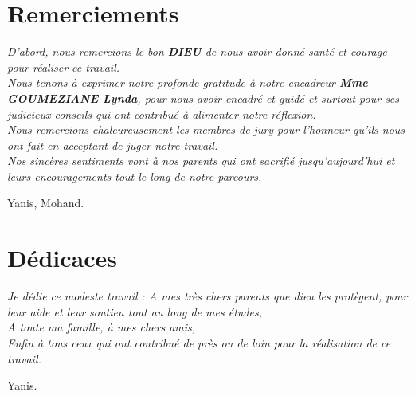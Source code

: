 \documentclass[11pt,a4paper,onecolumn,openright,oneside]{report}
\begin{document}
	\chapter*{\huge Remerciements}
	
	\begin{center}
		\it \Large
		D’abord, nous remercions le bon \textbf{DIEU} de nous avoir donné santé et courage pour réaliser ce travail.\\
		
		Nous tenons à exprimer notre profonde gratitude à notre encadreur \textbf{Mme GOUMEZIANE Lynda}, pour nous avoir encadré et guidé et surtout pour ses judicieux conseils qui ont contribué à alimenter notre réflexion.\\
		
		Nous remercions chaleureusement les membres de jury pour l’honneur qu’ils nous ont fait en acceptant de juger notre travail.\\
		
		Nos sincères sentiments vont à nos parents qui ont sacrifié jusqu’aujourd’hui et leurs encouragements tout le long de notre parcours.\\
		
		\leftskip=10cm 
		
		Yanis, Mohand.
		
		\leftskip=0cm
		
	\end{center}
	
	\chapter*{\huge Dédicaces}
	
	\begin{center}
		\it \Large
		Je dédie ce modeste travail :
		A mes très chers parents que dieu les
		protègent, pour leur aide et leur soutien tout au long
		de mes études,\\
		
		A toute ma famille, à mes chers amis,\\
		
		Enfin à tous ceux qui ont contribué de près
		ou de loin pour la réalisation de ce travail.\\
		
		\leftskip=12cm
		
		Yanis.
		
		\leftskip=0cm
		
	\end{center}
\end{document}
